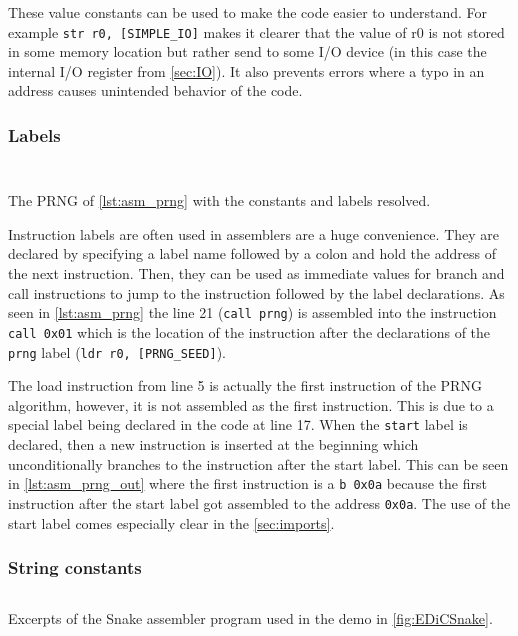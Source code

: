 These value constants can be used to make the code easier to understand.
For example \texttt{str r0, [SIMPLE_IO]} makes it clearer that the value of r0 is not stored in some memory location but rather send to some I/O device (in this case the internal I/O register from \cref{sec:IO}).
It also prevents errors where a typo in an address causes unintended behavior of the code.

\subsubsection{Labels}
\begin{listing}
  \begin{multicols}{2}
    \inputminted[linenos,
      breaklines,
      frame=leftline,
      xleftmargin=20pt,
    ]{ARM}{src/prng.s}
    \inputminted[breaklines, frame=leftline]{ARM}{src/prng_cmp.s}

  \end{multicols}
  \caption{The \gls{PRNG} of \cref{lst:asm_prng} with the constants and labels resolved.}
  \label{lst:asm_prng_cmp}
\end{listing}
Instruction labels are often used in assemblers are a huge convenience.
They are declared by specifying a label name followed by a colon and hold the address of the next instruction.
Then, they can be used as immediate values for branch and call instructions to jump to the instruction followed by the label declarations.
As seen in \cref{lst:asm_prng} the line 21 (\texttt{call prng}) is assembled into the instruction \texttt{call 0x01} which is the location of the instruction after the declarations of the \texttt{prng} label (\texttt{ldr r0, [PRNG_SEED]}).

The load instruction from line 5 is actually the first instruction of the \gls{PRNG} algorithm, however, it is not assembled as the first instruction.
This is due to a special label being declared in the code at line 17.
When the \texttt{start} label is declared, then a new instruction is inserted at the beginning which unconditionally branches to the instruction after the start label.
This can be seen in \cref{lst:asm_prng_out} where the first instruction is a \texttt{b 0x0a} because the first instruction after the start label got assembled to the address \texttt{0x0a}.
The use of the start label comes especially clear in the \cref{sec:imports}.

\subsubsection{String constants}
\begin{listing}
  \inputminted[linenos,
    breaklines,
    frame=leftline,
    xleftmargin=20pt,
  ]{ARM}{src/snake_excerpt.s}
  \caption{Excerpts of the Snake assembler program used in the demo in \cref{fig:EDiCSnake}.}
  \label{lst:asm_snake_excerpt}
\end{listing}


